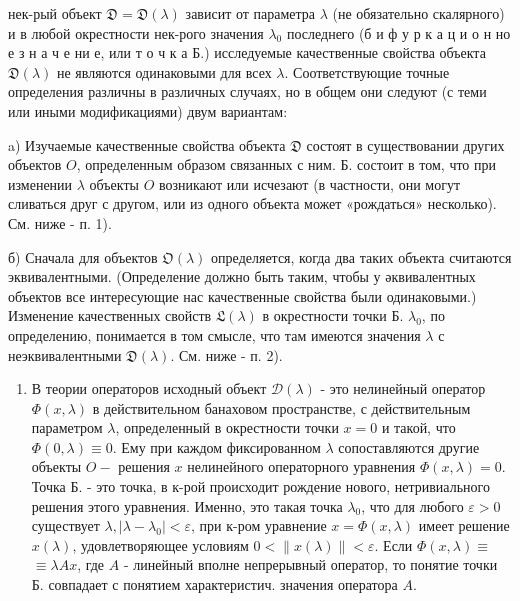 \documentclass[10pt]{article}
\begin{document}
нек-рый объект $\mathfrak{D}=\mathfrak{D}(\lambda)$ зависит от параметра $\lambda$ (не обязательно скалярного) и в любой окрестности нек-рого значения $\lambda_{0}$ последнего (б и ф у р к а ц и о н но е з н а ч е ни е, или т о ч к а Б.) исследуемые качественные свойства объекта $\mathfrak{D}(\lambda)$ не являются одинаковыми для всех $\lambda$. Соответствующие точные определения различны в различных случаях, но в общем они следуют (с теми или иными модификациями) двум вариантам:



a) Изучаемые качественные свойства объекта $\mathfrak{D}$ состоят в существовании других объектов $O$, определенным образом связанных с ним. Б. состоит в том, что при изменении $\lambda$ объекты $O$ возникают или исчезают (в частности, они могут сливаться друг с другом, или из одного объекта может «рождаться» несколько). См. ниже - п. 1).



б) Сначала для объектов $\mathfrak{O}(\lambda)$ определяется, когда два таких объекта считаются эквивалентными. (Определение должно быть таким, чтобы у әквивалентных объектов все интересующие нас качественные свойства были одинаковыми.) Изменение качественных свойств $\mathfrak{L}(\lambda)$ в окрестности точки Б. $\lambda_{0}$, по определению, понимается в том смысле, что там имеются значения $\lambda$ с неэквивалентными $\mathfrak{D}(\lambda)$. См. ниже - п. 2).



\begin{enumerate}

  \item В теории операторов исходный объект $\mathcal{D}(\lambda)$ - это нелинейный оператор $\Phi(x, \lambda)$ в действительном банаховом пространстве, с действительным параметром $\lambda$, определенный в окрестности точки $x=0$ и такой, что $\Phi(0, \lambda) \equiv 0$. Ему при каждом фиксированном $\lambda$ сопоставляются другие объекты $O-$ решения $x$ нелинейного операторного уравнения $\Phi(x, \lambda)=0$. Точка Б. - это точка, в к-рой происходит рождение нового, нетривиального решения этого уравнения. Именно, это такая точка $\lambda_{0}$, что для любого $\varepsilon>0$ существует $\lambda,\left|\lambda-\lambda_{0}\right|<\varepsilon$, при к-ром уравнение $x=\Phi(x, \lambda)$ имеет решение $x(\lambda)$, удовлетворяющее условиям $0<\|x(\lambda)\|<\varepsilon$. Если $\Phi(x, \lambda) \equiv$ $\equiv \lambda A x$, где $A$ - линейный вполне непрерывный оператор, то понятие точки Б. совпадает с понятием характеристич. значения оператора $A$.

\end{enumerate}
\end{document}
